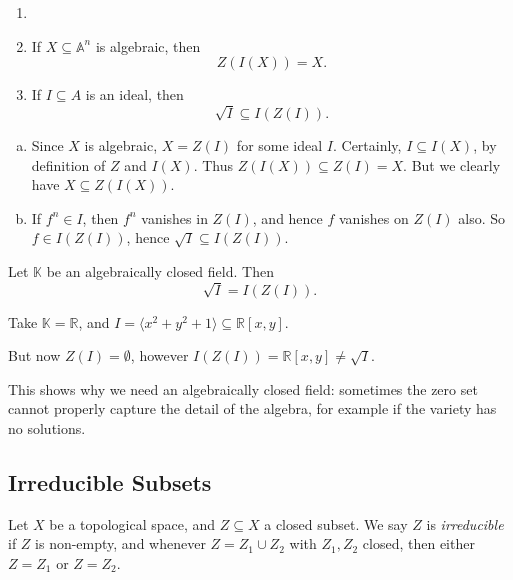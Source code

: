 \documentclass[12pt]{article}
\begin{document}
\begin{proposition}
	\begin{enumerate}[\normalfont(a)]
		\item[]
		\item If $X \subseteq \mathbb{A}^n$ is algebraic, then
			\[
			Z(I(X)) = X.
			\]
		\item If $I \subseteq A$ is an ideal, then
			\[
			\sqrt I \subseteq I(Z(I)).
			\]
	\end{enumerate}
\end{proposition}

\begin{proofbox}
	
	\begin{enumerate}[(a)]
		\item Since $X$ is algebraic, $X = Z(I)$ for some ideal $I$. Certainly, $I \subseteq I(X)$, by definition of $Z$ and $I(X)$. Thus $Z(I(X)) \subseteq Z(I) = X$. But we clearly have $X \subseteq Z(I(X))$.
		\item If $f^n \in I$, then $f^n$ vanishes in $Z(I)$, and hence $f$ vanishes on $Z(I)$ also. So $f \in I(Z(I))$, hence $\sqrt I \subseteq I(Z(I))$.
	\end{enumerate}
\end{proofbox}

\begin{theorem}
	Let $\mathbb{K}$ be an algebraically closed field. Then
	\[
	\sqrt I = I(Z(I)).
	\]
\end{theorem}

\begin{exbox}
	Take $\mathbb{K} = \mathbb{R}$, and $I = \langle x^2 + y^2 + 1 \rangle \subseteq \mathbb{R}[x, y]$.

	But now $Z(I) = \emptyset$, however $I(Z(I)) = \mathbb{R}[x, y] \neq \sqrt I$.
\end{exbox}

This shows why we need an algebraically closed field: sometimes the zero set cannot properly capture the detail of the algebra, for example if the variety has no solutions.

\subsection{Irreducible Subsets}
\label{sub:irr_sub}

\begin{definition}
	Let $X$ be a topological space, and $Z \subseteq X$ a closed subset. We say $Z$ is \emph{irreducible} if $Z$ is non-empty, and whenever $Z = Z_1 \cup Z_2$ with $Z_1, Z_2$ closed, then either $Z = Z_1$ or $Z = Z_2$.
\end{definition}
\end{document}
